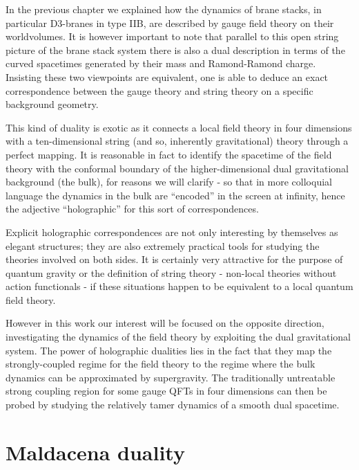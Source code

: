 
In the previous chapter we explained how the dynamics of brane stacks, in particular D3-branes in type IIB, are described by gauge field theory on their worldvolumes. It is however important to note that parallel to this open string picture of the brane stack system there is also a dual description in terms of the curved spacetimes generated by their mass and Ramond-Ramond charge. Insisting these two viewpoints are equivalent, one is able to deduce an exact correspondence between the gauge theory and string theory on a specific background geometry.

This kind of duality is exotic as it connects a local field theory in four dimensions with a ten-dimensional string (and so, inherently gravitational) theory through a perfect mapping. It is reasonable in fact to identify the spacetime of the field theory with the conformal boundary of the higher-dimensional dual gravitational background (the bulk), for reasons we will clarify - so that in more colloquial language the dynamics in the bulk are ``encoded'' in the screen at infinity, hence the adjective ``holographic'' for this sort of correspondences.

Explicit holographic correspondences are not only interesting by themselves as elegant structures; they are also extremely practical tools for studying the theories involved on both sides. It is certainly very attractive for the purpose of quantum gravity or the definition of string theory - non-local theories without action functionals - if these situations happen to be equivalent to a local quantum field theory.


However in this work our interest will be focused on the opposite direction, investigating the dynamics of the field theory by exploiting the dual gravitational system. The power of holographic dualities lies in the fact that they map the strongly-coupled regime for the field theory to the regime where the bulk dynamics can be approximated by supergravity. The traditionally untreatable strong coupling region for some gauge QFTs in four dimensions can then be probed by studying the relatively tamer dynamics of a smooth dual spacetime.



\section{Maldacena duality}

